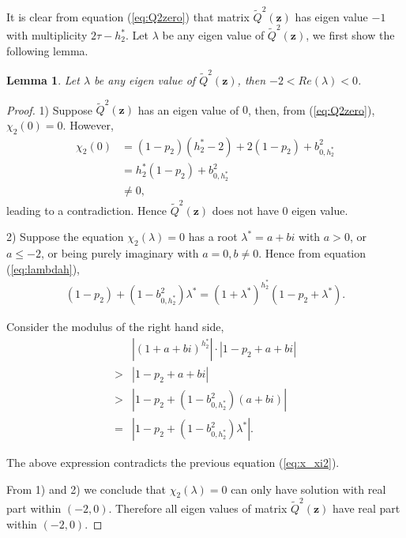 \documentclass[11pt,twocolumn]{IEEEtran}
\newtheorem{lemma}{Lemma}
\begin{document}
It is clear from equation (\ref{eq:Q2zero}) that matrix $\tilde{Q}^2(\bm z)$ has eigen value $-1$ with multiplicity $2\tau-h^*_2$. Let $\lambda$ be any eigen value of $\tilde{Q}^2(\bm z)$, we first show the following lemma.

\begin{lemma}
\label{lemma:real_bound}
Let $\lambda$ be any eigen value of $\tilde{Q}^2(\bm z)$, then $-2<Re(\lambda)<0$.
\end{lemma}

\begin{proof}
1) Suppose $\tilde{Q}^2(\bm z)$ has an eigen value of $0$, then, from (\ref{eq:Q2zero}), $\chi_2(0)=0$. However,
\begin{align}
\chi_2(0)&= (1{-}p_2)(h^*_2{-}2){+} 2(1{-}p_2) {+} b_{0, h^*_2}^2 \nonumber \\
&= h^*_2 (1{-}p_2) {+} b_{0, h^*_2}^2 \nonumber \\
& \neq 0, \nonumber
\end{align}
leading to a contradiction. Hence $\tilde{Q}^2(\bm z)$ does not have $0$ eigen value.

2) Suppose the equation $\chi_2(\lambda)=0$ has a root $\lambda^*=a+b i$ with $a>0$, or $a\leq-2$, or being purely imaginary with $a=0, b \neq 0$. Hence from equation (\ref{eq:lambdah}),
\begin{align}
(1{-}p_2){+}(1{-}b_{0, h^*_2}^2)\lambda^* {=}(1{+}\lambda^*)^{h^*_2} \label{eq:x_xi2} (1{-}p_2{+}\lambda^*).
\end{align}

Consider the  modulus of the right hand side,
\begin{align}
&|(1{+}a+b i)^{h^*_2}| \cdot | 1-p_2+a+b i | \nonumber\\
>& | 1-p_2+ a+b i | \nonumber \\
>& | 1-p_2+(1{-}b_{0, h^*_2}^2)(a+b i) | \nonumber \\
=& | 1-p_2+(1{-}b_{0, h^*_2}^2)\lambda^* |. \nonumber
\end{align}

The above expression contradicts the previous equation (\ref{eq:x_xi2}).
\vspace{4pt}

From 1) and 2) we conclude that $\chi_2(\lambda)=0$ can only have solution with real part within $(-2,0)$. Therefore all eigen values of matrix $\tilde{Q}^2(\bm z)$ have real part within $(-2,0)$.
\end{proof}
\vspace{5pt}
\end{document}
